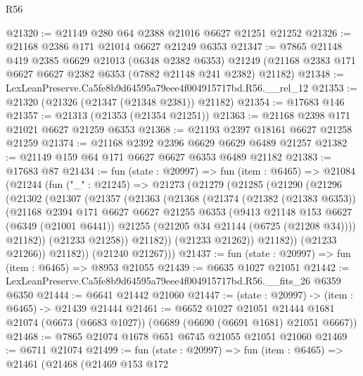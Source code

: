 \begin{lexlean}{R56}
\begin{coremodule}
@21320 := @21149 @280 @64 @2388 @21016 @6627 @21251 @21252
@21326 := @21168 @2386 @171 @21014 @6627 @21249 @6353
@21347 := @7865
    @21148
    @419
    @2385
    @6629
    @21013
    (@6348 @2382 @6353)
    @21249
    (@21168 @2383 @171 @6627 @6627 @2382 @6353 (@7882 @21148 @241 @2382) @21182)
@21348 := LexLeanPreserve.Ca5fe8b9d64595a79eee4f004915717bd.R56.__rel_12
@21353 := @21320 (@21326 (@21347 (@21348 @2381)) @21182)
@21354 := @17683 @146
@21357 := @21313 (@21353 (@21354 @21251))
@21363 := @21168 @2398 @171 @21021 @6627 @21259 @6353
@21368 := @21193 @2397 @18161 @6627 @21258 @21259
@21374 := @21168 @2392 @2396 @6629 @6629 @6489 @21257
@21382 := @21149 @159 @64 @171 @6627 @6627 @6353 @6489 @21182
@21383 := @17683 @87
@21434 := fun (state : @20997) =>
  fun (item : @6465) =>
  @21084
    (@21244
      (fun ("_" : @21245) =>
      @21273
        (@21279
          (@21285
            (@21290
              (@21296
                (@21302
                  (@21307
                    (@21357
                      (@21363
                        (@21368
                          (@21374
                            (@21382 (@21383 @6353))
                            (@21168
                              @2394
                              @171
                              @6627
                              @6627
                              @21255
                              @6353
                              (@9413
                                @21148
                                @153
                                @6627
                                (@6349 (@21001 @6441))
                                @21255
                                (@21205 @34 @21144 (@6725 (@21208 @34))))
                              @21182))
                          (@21233 @21258))
                        @21182))
                    (@21233 @21262))
                  @21182))
              (@21233 @21266))
            @21182))
        (@21240 @21267)))
@21437 := fun (state : @20997) => fun (item : @6465) => @8953 @21055
@21439 := @6635 @1027 @21051
@21442 := LexLeanPreserve.Ca5fe8b9d64595a79eee4f004915717bd.R56.__fits_26 @6359 @6350
@21444 := @6641 @21442 @21060
@21447 := (state : @20997) -> (item : @6465) -> @21439 @21444
@21461 := @6652
    @1027
    @21051
    @21444
    @1681
    @21074
    (@6673 (@6683 @1027))
    (@6689 (@6690 (@6691 @1681) @21051 @6667))
@21468 := @7865 @21074 @1678 @651 @6745 @21055 @21051 @21060
@21469 := @6711 @21074
@21499 := fun (state : @20997) =>
  fun (item : @6465) =>
  @21461
    (@21468
      (@21469
        @153
        @172

\end{coremodule}
\end{lexlean}
